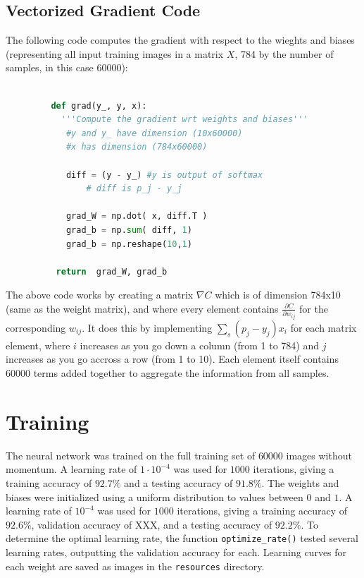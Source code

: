 \documentclass{article}
\begin{document}
   \subsection{Vectorized Gradient Code}
   The following code computes the gradient with respect to the wieghts and biases
   (representing all input training images in a matrix $X$, 784 by the number of samples, in this case 60000):
      \begin{lstlisting}[language=Python]

         def grad(y_, y, x):
      	   '''Compute the gradient wrt weights and biases'''
          	#y and y_ have dimension (10x60000)
          	#x has dimension (784x60000)

          	diff = (y - y_) #y is output of softmax
              	# diff is p_j - y_j

          	grad_W = np.dot( x, diff.T )
          	grad_b = np.sum( diff, 1)
          	grad_b = np.reshape(10,1)

          return  grad_W, grad_b
      \end{lstlisting}

   The above code works by creating a matrix $\nabla C $ which is of dimension 784x10
   (same as the weight matrix), and where every element contains $\frac{ \partial C}{ \partial w_{ij} }$ for the corresponding $w_{ij}$.
   It does this by implementing $\sum_s ( p_j - y_j ) x_i$ for each matrix element, where $i$ increases as you go down
   a column (from 1 to 784) and $j$ increases as you go accross a row (from 1 to 10). Each element itself contains 60000
   terms added together to aggregate the information from all samples.

   \section{Training}
   The neural network was trained on the full training set of $60000$ images without momentum.
   A learning rate of $1 \cdot 10^{-4}$ was used for $1000$ iterations, giving a training accuracy of $92.7\%$
   and a testing accuracy of $91.8\%$.
   The weights and biases were initialized using a uniform distribution to values between $0$ and $1$.
   A learning rate of $10^{-4}$ was used for $1000$ iterations, giving a training accuracy of $92.6\%$,
   validation accuracy of XXX, and a testing accuracy of $92.2\%$.
   To determine the optimal learning rate, the function \texttt{optimize\_rate()} tested several
   learning rates, outputting the validation accuracy for each. Learning curves for each weight
   are saved as images in the \texttt{resources} directory.
\end{document}

